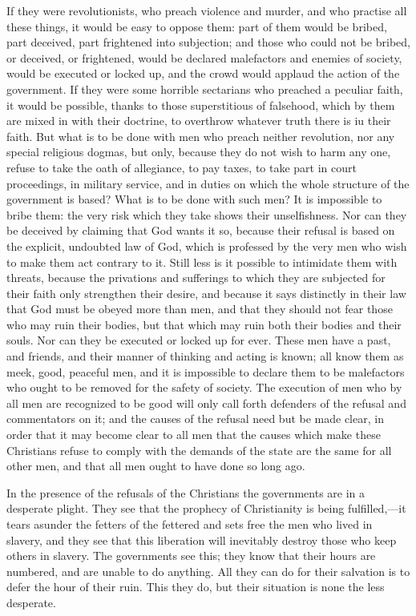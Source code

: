 \documentclass{book}
\begin{document}
If they were revolutionists, who preach violence and murder, and who practise all these things, it would be easy to oppose them: part of them would be bribed, part deceived, part frightened into subjection; and those who could not be bribed, or deceived, or frightened, would be declared malefactors and enemies of society, would be executed or locked up, and the crowd would applaud the action of the government. If they were some horrible sectarians who preached a peculiar faith, it would be possible, thanks to those superstitious of falsehood, which by them are mixed in with their doctrine, to overthrow whatever truth there is iu their faith. But what is to be done with men who preach neither revolution, nor any special religious dogmas, but only, because they do not wish to harm any one, refuse to take the oath of allegiance, to pay taxes, to take part in court proceedings, in military service, and in duties on which the whole structure of the government is based? What is to be done with such men? It is impossible to bribe them: the very risk which they take shows their unselfishness. Nor can they be deceived by claiming that God wants it so, because their refusal is based on the explicit, undoubted law of God, which is professed by the very men who wish to make them act contrary to it. Still less is it possible to intimidate them with threats, because the privations and sufferings to which they are subjected for their faith only strengthen their desire, and because it says distinctly in their law that God must be obeyed more than men, and that they should not fear those who may ruin their bodies, but that which may ruin both their bodies and their souls. Nor can they be executed or locked up for ever. These men have a past, and friends, and their manner of thinking and acting is known; all know them as meek, good, peaceful men, and it is impossible to declare them to be malefactors who ought to be removed for the safety of society. The execution of men who by all men are recognized to be good will only call forth defenders of the refusal and commentators on it; and the causes of the refusal need but be made clear, in order that it may become clear to all men that the causes which make these Christians refuse to comply with the demands of the state are the same for all other men, and that all men ought to have done so long ago.

In the presence of the refusals of the Christians the governments are in a desperate plight. They see that the prophecy of Christianity is being fulfilled,—it tears asunder the fetters of the fettered and sets free the men who lived in slavery, and they see that this liberation will inevitably destroy those who keep others in slavery. The governments see this; they know that their hours are numbered, and are unable to do anything. All they can do for their salvation is to defer the hour of their ruin. This they do, but their situation is none the less desperate.
\end{document}

